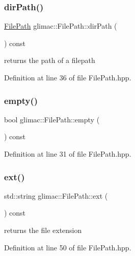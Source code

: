 \subsubsection{\texorpdfstring{dir\+Path()}{dirPath()}}
{\footnotesize\ttfamily \hyperlink{classglimac_1_1_file_path}{File\+Path} glimac\+::\+File\+Path\+::dir\+Path (\begin{DoxyParamCaption}{ }\end{DoxyParamCaption}) const\hspace{0.3cm}{\ttfamily [inline]}}

returns the path of a filepath 

Definition at line 36 of file File\+Path.\+hpp.

\mbox{\label{classglimac_1_1_file_path_a660dea9e8324aac4962bca25b963ef77}} 
\subsubsection{\texorpdfstring{empty()}{empty()}}
{\footnotesize\ttfamily bool glimac\+::\+File\+Path\+::empty (\begin{DoxyParamCaption}{ }\end{DoxyParamCaption}) const\hspace{0.3cm}{\ttfamily [inline]}}



Definition at line 31 of file File\+Path.\+hpp.

\mbox{\label{classglimac_1_1_file_path_ac36e170d0864ed2c5f1296dac2104b15}} 
\subsubsection{\texorpdfstring{ext()}{ext()}}
{\footnotesize\ttfamily std\+::string glimac\+::\+File\+Path\+::ext (\begin{DoxyParamCaption}{ }\end{DoxyParamCaption}) const\hspace{0.3cm}{\ttfamily [inline]}}

returns the file extension 

Definition at line 50 of file File\+Path.\+hpp.

